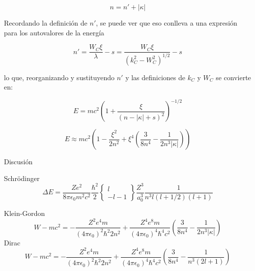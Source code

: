 \documentclass{beamer}
\begin{document}
\begin{frame}
\begin{equation}
n=n'+|\kappa|
\end{equation}

Recordando la definici\'on de $n'$, se puede ver que eso conlleva a una expresi\'on para los autovalores de la energ\'ia

\begin{equation}
n'= \frac{W_C \xi}{\lambda}-s=\frac{W_C \xi}{(k^2_{C}-W^2_{C})^{1/2}}-s
\end{equation}

lo que, reorganizando y sustituyendo $n'$ y las definiciones 
de $k_C$ y $W_C$  se convierte en:

\begin{equation}\label{eq:enerW}
E = mc^2 \left(1+\dfrac{\xi}{(n-|\kappa|+s)^2} \right)^{-1/2}
\end{equation}
\end{frame}

\begin{frame}
\begin{equation}\label{eq:enerW4}
E \approx mc^2 \left(  1- \frac{\xi^2}{2n^2} +\xi^4 \left( \frac{3}{8n^4}-\frac{1}{2n^3 |\kappa|} \right)  \right)
\end{equation}
\end{frame}

\begin{frame}{Discusi\'on}

\centering

Schr\"odinger
\begin{equation}
\Delta E = \frac{Ze^2}{8\pi \epsilon_0 m^2c^2}\frac{\hbar^2}{2} \left\{ \substack{ l \\ -l -1}   \right\}\frac{Z^3}{a^3_0}\frac{1}{n^3 l (l+1/2)(l+1)}
\end{equation}

Klein-Gordon
 \begin{equation}\label{eq:enerWfinal}
W-mc^2 = -\frac{Z^2e^4m}{(4\pi\epsilon_0)^2\hbar^2 2n^2}+\frac{Z^4e^8m}{(4\pi\epsilon_0)^4\hbar^4 c^2} \left( \frac{ 3}{8n^4}-\frac{1}{2n^3|\kappa|} \right)
\end{equation}
Dirac
\begin{equation}
W-mc^2 = -\frac{Z^2e^4m}{(4\pi\epsilon_0)^2\hbar^2 2n^2}+\frac{Z^4e^8m}{(4\pi\epsilon_0)^4\hbar^4 c^2} \left( \frac{ 3}{8n^4}-\frac{1}{n^3(2l+1)} \right)
\end{equation}

\end{frame}
\end{document}
